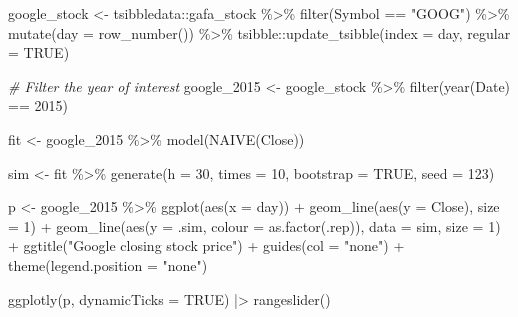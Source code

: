 \documentclass[
  letterpaper,
  DIV=11,
  numbers=noendperiod]{scrartcl}
\newenvironment{Shaded}{}{}
\newcommand{\AttributeTok}[1]{\textcolor[rgb]{0.65,0.15,0.64}{#1}}
\newcommand{\CommentTok}[1]{\textcolor[rgb]{0.63,0.63,0.65}{\textit{#1}}}
\newcommand{\ConstantTok}[1]{\textcolor[rgb]{0.60,0.41,0.00}{#1}}
\newcommand{\DecValTok}[1]{\textcolor[rgb]{0.60,0.41,0.00}{#1}}
\newcommand{\FunctionTok}[1]{\textcolor[rgb]{0.25,0.47,0.95}{#1}}
\newcommand{\NormalTok}[1]{\textcolor[rgb]{0.22,0.23,0.26}{#1}}
\newcommand{\OtherTok}[1]{\textcolor[rgb]{0.15,0.68,0.38}{#1}}
\newcommand{\SpecialCharTok}[1]{\textcolor[rgb]{0.00,0.52,0.74}{#1}}
\newcommand{\StringTok}[1]{\textcolor[rgb]{0.31,0.63,0.31}{#1}}
\begin{document}
\begin{Shaded}
\begin{Highlighting}[]
\NormalTok{google\_stock }\OtherTok{\textless{}{-}}\NormalTok{ tsibbledata}\SpecialCharTok{::}\NormalTok{gafa\_stock }\SpecialCharTok{\%\textgreater{}\%}
  \FunctionTok{filter}\NormalTok{(Symbol }\SpecialCharTok{==} \StringTok{"GOOG"}\NormalTok{) }\SpecialCharTok{\%\textgreater{}\%}
  \FunctionTok{mutate}\NormalTok{(}\AttributeTok{day =} \FunctionTok{row\_number}\NormalTok{()) }\SpecialCharTok{\%\textgreater{}\%}
\NormalTok{  tsibble}\SpecialCharTok{::}\FunctionTok{update\_tsibble}\NormalTok{(}\AttributeTok{index =}\NormalTok{ day, }\AttributeTok{regular =} \ConstantTok{TRUE}\NormalTok{)}

\CommentTok{\# Filter the year of interest}
\NormalTok{google\_2015 }\OtherTok{\textless{}{-}}\NormalTok{ google\_stock }\SpecialCharTok{\%\textgreater{}\%} \FunctionTok{filter}\NormalTok{(}\FunctionTok{year}\NormalTok{(Date) }\SpecialCharTok{==} \DecValTok{2015}\NormalTok{)}

\NormalTok{fit }\OtherTok{\textless{}{-}}\NormalTok{ google\_2015 }\SpecialCharTok{\%\textgreater{}\%}
  \FunctionTok{model}\NormalTok{(}\FunctionTok{NAIVE}\NormalTok{(Close))}

\NormalTok{sim }\OtherTok{\textless{}{-}}\NormalTok{ fit }\SpecialCharTok{\%\textgreater{}\%}  \FunctionTok{generate}\NormalTok{(}\AttributeTok{h =} \DecValTok{30}\NormalTok{, }\AttributeTok{times =} \DecValTok{10}\NormalTok{, }\AttributeTok{bootstrap =} \ConstantTok{TRUE}\NormalTok{, }\AttributeTok{seed =} \DecValTok{123}\NormalTok{)}

\NormalTok{p }\OtherTok{\textless{}{-}}\NormalTok{ google\_2015 }\SpecialCharTok{\%\textgreater{}\%}
  \FunctionTok{ggplot}\NormalTok{(}\FunctionTok{aes}\NormalTok{(}\AttributeTok{x =}\NormalTok{ day)) }\SpecialCharTok{+}
  \FunctionTok{geom\_line}\NormalTok{(}\FunctionTok{aes}\NormalTok{(}\AttributeTok{y =}\NormalTok{ Close), }\AttributeTok{size =} \DecValTok{1}\NormalTok{) }\SpecialCharTok{+}
  \FunctionTok{geom\_line}\NormalTok{(}\FunctionTok{aes}\NormalTok{(}\AttributeTok{y =}\NormalTok{ .sim, }\AttributeTok{colour =} \FunctionTok{as.factor}\NormalTok{(.rep)), }\AttributeTok{data =}\NormalTok{ sim, }\AttributeTok{size =} \DecValTok{1}\NormalTok{) }\SpecialCharTok{+}
  \FunctionTok{ggtitle}\NormalTok{(}\StringTok{"Google closing stock price"}\NormalTok{) }\SpecialCharTok{+}
  \FunctionTok{guides}\NormalTok{(}\AttributeTok{col =} \StringTok{"none"}\NormalTok{) }\SpecialCharTok{+}
  \FunctionTok{theme}\NormalTok{(}\AttributeTok{legend.position =} \StringTok{"none"}\NormalTok{)}

\FunctionTok{ggplotly}\NormalTok{(p, }\AttributeTok{dynamicTicks =} \ConstantTok{TRUE}\NormalTok{) }\SpecialCharTok{|\textgreater{}} \FunctionTok{rangeslider}\NormalTok{()}
\end{Highlighting}
\end{Shaded}
\end{document}
